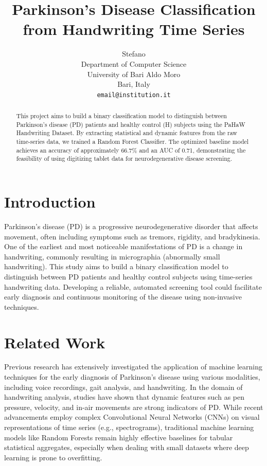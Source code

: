 \documentclass{article}
\title{Parkinson's Disease Classification from Handwriting Time Series}
\author{
 Stefano \\
  Department of Computer Science \\
  University of Bari Aldo Moro \\
  Bari, Italy \\
  \texttt{email@institution.it} \\
}
\begin{document}
\maketitle

\begin{abstract}
This project aims to build a binary classification model to distinguish between Parkinson's disease (PD) patients and healthy control (H) subjects using the PaHaW Handwriting Dataset. By extracting statistical and dynamic features from the raw time-series data, we trained a Random Forest Classifier. The optimized baseline model achieves an accuracy of approximately 66.7\% and an AUC of 0.71, demonstrating the feasibility of using digitizing tablet data for neurodegenerative disease screening.
\end{abstract}

\section{Introduction}
Parkinson's disease (PD) is a progressive neurodegenerative disorder that affects movement, often including symptoms such as tremors, rigidity, and bradykinesia. One of the earliest and most noticeable manifestations of PD is a change in handwriting, commonly resulting in micrographia (abnormally small handwriting). This study aims to build a binary classification model to distinguish between PD patients and healthy control subjects using time-series handwriting data. Developing a reliable, automated screening tool could facilitate early diagnosis and continuous monitoring of the disease using non-invasive techniques.

\section{Related Work}
Previous research has extensively investigated the application of machine learning techniques for the early diagnosis of Parkinson's disease using various modalities, including voice recordings, gait analysis, and handwriting. In the domain of handwriting analysis, studies have shown that dynamic features such as pen pressure, velocity, and in-air movements are strong indicators of PD. While recent advancements employ complex Convolutional Neural Networks (CNNs) on visual representations of time series (e.g., spectrograms), traditional machine learning models like Random Forests remain highly effective baselines for tabular statistical aggregates, especially when dealing with small datasets where deep learning is prone to overfitting.
\end{document}
